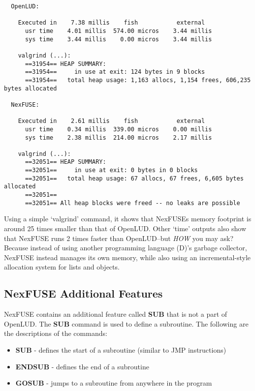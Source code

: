 \documentclass{article}
\begin{document}
\begin{verbatim}
  OpenLUD:

    Executed in    7.38 millis    fish           external
      usr time    4.01 millis  574.00 micros    3.44 millis
      sys time    3.44 millis    0.00 micros    3.44 millis

    valgrind (...):
      ==31954== HEAP SUMMARY:
      ==31954==     in use at exit: 124 bytes in 9 blocks
      ==31954==   total heap usage: 1,163 allocs, 1,154 frees, 606,235 bytes allocated

  NexFUSE:

    Executed in    2.61 millis    fish           external
      usr time    0.34 millis  339.00 micros    0.00 millis
      sys time    2.38 millis  214.00 micros    2.17 millis

    valgrind (...):
      ==32051== HEAP SUMMARY:
      ==32051==     in use at exit: 0 bytes in 0 blocks
      ==32051==   total heap usage: 67 allocs, 67 frees, 6,605 bytes allocated
      ==32051== 
      ==32051== All heap blocks were freed -- no leaks are possible
\end{verbatim}

Using a simple `valgrind' command, it shows that NexFUSEs memory footprint is
around 25 times smaller than that of OpenLUD. Other `time' outputs also show
that NexFUSE runs 2 times faster than OpenLUD--but \emph{HOW} you may ask?
Because instead of using another programming language (D)'s garbage collector,
NexFUSE instead manages its own memory, while also using an incremental-style
allocation system for lists and objects.

\subsection{NexFUSE Additional Features}

NexFUSE contains an additional feature called \textbf{SUB} that is not a part of
OpenLUD. The \textbf{SUB} command is used to define a subroutine. The following
are the descriptions of the commands:

\begin{itemize}
  \item \textbf{SUB} - defines the start of a subroutine (similar to JMP instructions)
  \item \textbf{ENDSUB} - defines the end of a subroutine
  \item \textbf{GOSUB} - jumps to a subroutine from anywhere in the program
\end{itemize}
\end{document}
